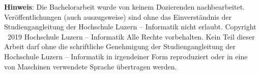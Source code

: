 	

	\noindent
	{\textbf{Hinweis}}: Die Bachelorarbeit wurde von keinem Dozierenden nachbearbeitet. Ver\"offentlichungen (auch auszugsweise) sind ohne das Einverst\"andnis der Studiengangleitung der Hochschule Luzern -- Informatik nicht erlaubt. \newline \newline
	Copyright \textcopyright\ {\color{red}2019} Hochschule Luzern -- Informatik \newline \newline
	Alle Rechte vorbehalten. Kein Teil dieser Arbeit darf ohne die schriftliche Genehmigung der Studiengangleitung der Hochschule Luzern -- Informatik in irgendeiner Form reproduziert oder in eine von Maschinen verwendete Sprache \"ubertragen werden.
	
	\newpage
	

